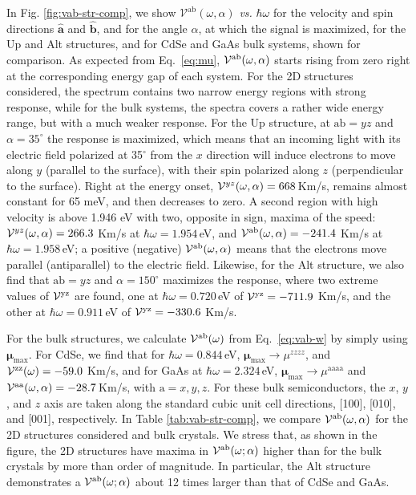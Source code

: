 \documentclass[floatfix,prb,aps,superscriptaddress,showpacs,11pt,preprint,letterpaper]{revtex4}
\begin{document}
In Fig. \ref{fig:vab-str-comp}, we show $\mathcal{V}^{\mathrm{ab}}
(\omega,\alpha)$ {\it vs.} $\hbar\omega$ for the 
velocity and spin
directions
$\hat{\mathbf{a}}$ and $\hat{\mathbf{b}}$, and for the angle $\alpha$, at which
the signal is maximized, for the Up  and Alt structures, and for CdSe and GaAs
bulk systems, shown for comparison. As expected from
Eq.~\eqref{eq:mu}, 
${\cal V}^{\mathrm{a}\mathrm{b}}(\omega,\alpha)$ starts rising 
from zero right at the
corresponding energy gap of each system. For the 2D structures considered, the
spectrum contains two narrow energy regions with strong response, while for the
bulk systems, the spectra covers a rather wide energy range, but with a much
weaker response. For the Up structure, at $\mathrm{a}\mathrm{b}=yz$ and
$\alpha=35^\circ$ the response is maximized, which means that an incoming light
with its electric field polarized at 35$^\circ$ from the $x$ direction will
induce electrons to move along $y$ (parallel to the surface), with their spin
polarized along $z$ (perpendicular to the surface). Right at the energy onset, ${\cal
V}^{yz}(\omega,\alpha)=668$\,Km/s, remains almost constant for 65 meV, and then
decreases to zero. A second region with high velocity is above 1.946 eV with
two, opposite in sign, maxima of the speed: ${\cal
V}^{yz}(\omega,\alpha)=266.3$ Km/s at $\hbar\omega=1.954$\,eV, and ${\cal
V}^{\mathrm{a}\mathrm{b}}(\omega,\alpha)=-241.4$ Km/s at
$\hbar\omega=1.958$\,eV; a positive (negative) ${\cal
V}^{\mathrm{a}\mathrm{b}}(\omega,\alpha)$ means that the electrons move
parallel (antiparallel) to the electric field. Likewise, for the Alt structure,
we also find that $\mathrm{a}\mathrm{b}=yz$ and $\alpha=150^\circ$ maximizes
the response, where two extreme values of ${\cal V}^{\mathrm{y}\mathrm{z}}$ are
found, one at  $\hbar\omega=0.720$\,eV of ${\cal
V}^{\mathrm{y}\mathrm{z}}=-711.9$ Km/s, and the other at
$\hbar\omega=0.911$\,eV of ${\cal V}^{\mathrm{y}\mathrm{z}}=-330.6$ Km/s.
 
For the bulk structures, we calculate ${\cal V}^{\mathrm{a}\mathrm{b}}(\omega)$
from Eq.~\eqref{eq:vab-w} by simply using $\boldsymbol{\mu}_{\mathrm{max}}$.
For CdSe, we find that for $\hbar\omega=0.844$\,eV,
$\boldsymbol{\mu}_{\mathrm{max}}\to \mu^{zzzz}$, and ${\cal
V}^{\mathrm{z}\mathrm{z}}(\omega)=-59.0$ Km/s, and for GaAs at
$\hbar\omega=2.324$\,eV,
$\boldsymbol{\mu}_{\mathrm{max}}\to\mu^{\mathrm{aaaa}}$ and ${\cal
V}^{\mathrm{a}\mathrm{a}}(\omega,\alpha)=-28.7$\,Km/s, with $\mathrm{a}=x,y,z$.
For these bulk semiconductors, the $x$, $y$, and $z$ axis are taken along the
standard cubic unit cell directions, [100], [010], and [001], respectively. In
Table \ref{tab:vab-str-comp}, we compare ${\cal
V}^{\mathrm{a}\mathrm{b}}(\omega,\alpha)$ for the 2D structures considered and
bulk crystals. We stress that, as shown in the figure, the 2D structures
have maxima in ${\cal V}^{\mathrm{a}\mathrm{b}}(\omega;\alpha)$  higher than
for the bulk crystals by more than order of magnitude. 
In particular, the Alt structure demonstrates a 
${\cal V}^{\mathrm{a}\mathrm{b}}(\omega;\alpha)$ 
about 12 times larger than that
of CdSe and GaAs.
\end{document}
